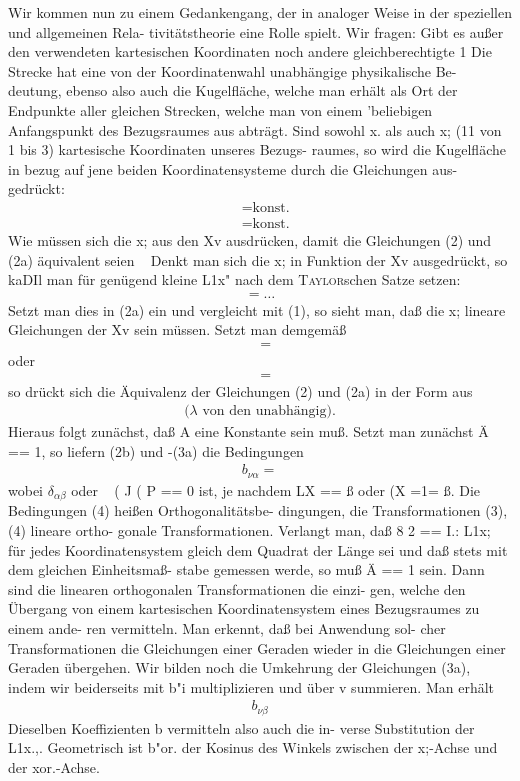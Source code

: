 Wir kommen nun zu einem Gedankengang, der in
analoger Weise in der speziellen und allgemeinen Rela-
tivitätstheorie eine Rolle spielt. Wir fragen: Gibt es
außer den verwendeten kartesischen Koordinaten noch
andere gleichberechtigte 1 Die Strecke hat eine von
der Koordinatenwahl unabhängige physikalische Be-
deutung, ebenso also auch die Kugelfläche, welche man
erhält als Ort der Endpunkte aller gleichen Strecken,
welche man von einem 'beliebigen Anfangspunkt des
Bezugsraumes aus abträgt. Sind sowohl x. als auch x;
(11 von 1 bis 3) kartesische Koordinaten unseres Bezugs-
raumes, so wird die Kugelfläche in bezug auf jene
beiden Koordinatensysteme durch die Gleichungen aus-
gedrückt:
\begin{align}
    &= \text{konst.}
    \\
    &= \text{konst.}
    \tag{2a}
\end{align}
Wie müssen sich die x; aus den Xv ausdrücken, damit die
Gleichungen (2) und (2a) äquivalent seien
~
Denkt man
sich die x; in Funktion der Xv ausgedrückt, so kaDIl man
für genügend kleine L1x" nach dem \textsc{Taylor}schen Satze
setzen:
\begin{align}
    = \ldots
\end{align}
Setzt man dies in (2a) ein und vergleicht mit (1), so sieht
man, daß die x; lineare Gleichungen der Xv sein müssen.
Setzt man demgemäß
\begin{align}
    &=
\end{align}
oder
\begin{align}
    &=
    \tag{3a}
\end{align}
so drückt sich die Äquivalenz der Gleichungen (2) und
(2a) in der Form aus
\begin{align}
    \text{($\lambda$ von den unabhängig)}.
    \tag{3b}
\end{align}
Hieraus folgt zunächst, daß A eine Konstante sein muß.
Setzt man zunächst Ä == 1, so liefern (2b) und -(3a) die
Bedingungen
\begin{align}
    b_{\nu \alpha} =
\end{align}
wobei $\delta_{\alpha\beta}$ oder ~ ( J ( P == 0 ist, je nachdem LX == ß oder
(X =1= ß. Die Bedingungen (4) heißen Orthogonalitätsbe-
dingungen, die Transformationen (3), (4) lineare ortho-
gonale Transformationen. Verlangt man, daß 8 2 == I.: L1x;
für jedes Koordinatensystem gleich dem Quadrat der
Länge sei und daß stets mit dem gleichen Einheitsmaß-
stabe gemessen werde, so muß Ä == 1 sein. Dann sind
die linearen orthogonalen Transformationen die einzi-
gen, welche den Übergang von einem kartesischen
Koordinatensystem eines Bezugsraumes zu einem ande-
ren vermitteln. Man erkennt, daß bei Anwendung sol-
cher Transformationen die Gleichungen einer Geraden
wieder in die Gleichungen einer Geraden übergehen.
Wir bilden noch die Umkehrung der Gleichungen (3a),
indem wir beiderseits mit b"i multiplizieren und über v
summieren. Man erhält
\begin{align}
    b_{\nu\beta}
\end{align}
Dieselben Koeffizienten b vermitteln also auch die in-
verse Substitution der L1x.,. Geometrisch ist b"or. der
Kosinus des Winkels zwischen der x;-Achse und der
xor.-Achse.

